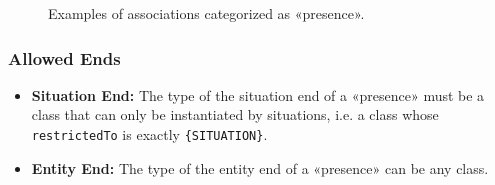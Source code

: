 \begin{figure}[h]
    \centering
    
    \caption{Examples of associations categorized as «presence».}
    \label{fig:presence-example}
\end{figure}

\subsubsection{Allowed Ends}

\begin{itemize}
    \item \textbf{Situation End:} The type of the situation end of a «presence» must be a class that can only be instantiated by situations, i.e. a class whose \texttt{restrictedTo} is exactly \texttt{\{SITUATION\}}.
    \item \textbf{Entity End:} The type of the entity end of a «presence» can be any class.
\end{itemize}





